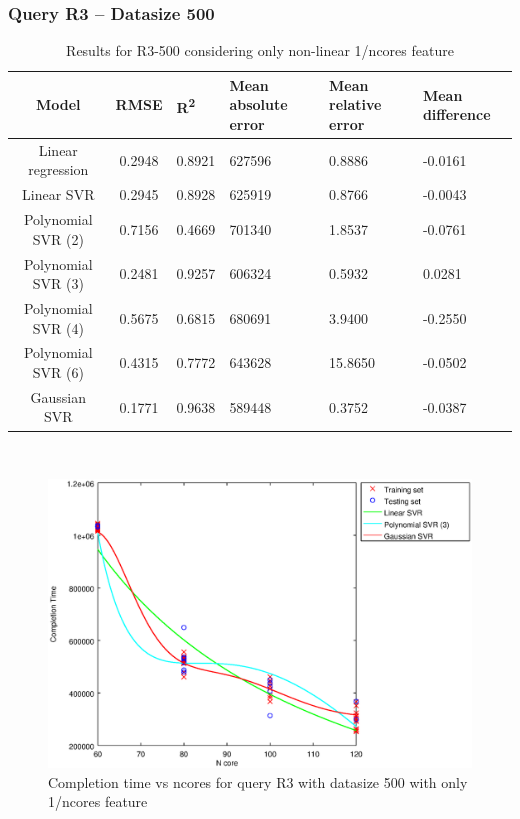 \documentclass[a4paper,11pt]{article}
\begin{document}
\newpage
\subsubsection{Query R3 -- Datasize 500}
\begin{table}[H]
	\centering
	\begin{adjustbox}{center}
		\begin{tabular}{c | c M{1.2cm} M{2.5cm} M{2.5cm} M{1.8cm}}
			Model & RMSE & R\textsuperscript{2} & Mean absolute error & Mean relative error & Mean difference \tabularnewline
			\hline
			Linear regression & 0.2948 & 0.8921 & 627596 & 0.8886 & -0.0161 \\
			Linear SVR & 0.2945 & 0.8928 & 625919 & 0.8766 & -0.0043 \\
			Polynomial SVR (2) & 0.7156 & 0.4669 & 701340 & 1.8537 & -0.0761 \\
			Polynomial SVR (3) & 0.2481 & 0.9257 & 606324 & 0.5932 & 0.0281 \\
			Polynomial SVR (4) & 0.5675 & 0.6815 & 680691 & 3.9400 & -0.2550 \\
			Polynomial SVR (6) & 0.4315 & 0.7772 & 643628 & 15.8650 & -0.0502 \\
			Gaussian SVR & 0.1771 & 0.9638 & 589448 & 0.3752 & -0.0387 \\
		\end{tabular}
	\end{adjustbox}
	\\
	\caption{Results for R3-500 considering only non-linear 1/ncores feature}
	\label{table_R3_prediction_all}
\end{table}

\begin {figure}[hbtp]
\centering
\includegraphics[width=\textwidth]{output/R3_500_ONLY_1_OVER_NCORES/plot_R3_500_bestmodels.eps}
\caption {Completion time vs ncores for query R3 with datasize 500 with only 1/ncores feature}
\end {figure}
\end{document}
